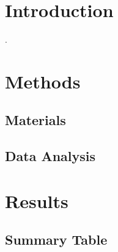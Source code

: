 \section{Introduction} \label{sec:introduction}

\lipsum[1] \cite{Hoffman_2023_a}.

\lipsum[2]

\section{Methods} \label{sec:methods}

\lipsum[1]

\subsection{Materials} \label{sec:methods:materials}

\lipsum[1]

\subsection{Data Analysis} \label{sec:methods:analysis}

\lipsum[1]

\section{Results} \label{sec:results}

\lipsum[1]


\subsection{Summary Table} \label{sec:results:table}

\lipsum[2]


